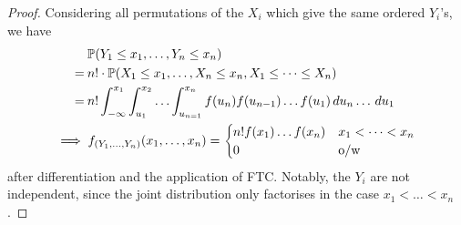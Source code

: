 \documentclass{../../template/note}
\begin{document}
    \begin{proof}
        Considering all permutations of the \(X_i\) which give the same ordered \(Y_i\)'s, we have
        \begin{align*}
            &\:\mathbb P(Y_1 \leq x_1, \dots, Y_n \leq x_n) \\ =&\: n! \cdot \mathbb P(X_1 \leq x_1, \dots, X_n \leq x_n, X_1 \leq \dots \leq X_n) \\
            =&\: n! \int_{-\infty}^{x_1} \int_{u_1}^{x_2} \dots \int_{u_{n=1}}^{x_n} f(u_n)f(u_{n-1})\dots f(u_1) \,d{u}_n \dots \,d{u}_1 \\
            \implies &\; f_{(Y_1, \dots, Y_n)}(x_1, \dots, x_n) = \begin{cases}
                n!f(x_1) \dots f(x_n) & x_1 < \dots < x_n \\
                0 & \text{o/w}
            \end{cases}
        \end{align*}
        after differentiation and the application of FTC. Notably, the \(Y_i\) are not independent, since the joint distribution only factorises in the case \(x_1 < \dots < x_n\).      
    \end{proof}
\end{document}
